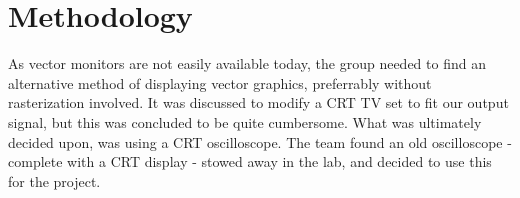 \chapter{Methodology}

As vector monitors are not easily available today, the group needed to find an alternative method of displaying vector graphics, preferrably without rasterization involved.
It was discussed to modify a CRT TV set to fit our output signal, but this was concluded to be quite cumbersome.
What was ultimately decided upon, was using a CRT oscilloscope. The team found an old oscilloscope - complete with a CRT display - stowed away in the lab, and decided to use this for the project.